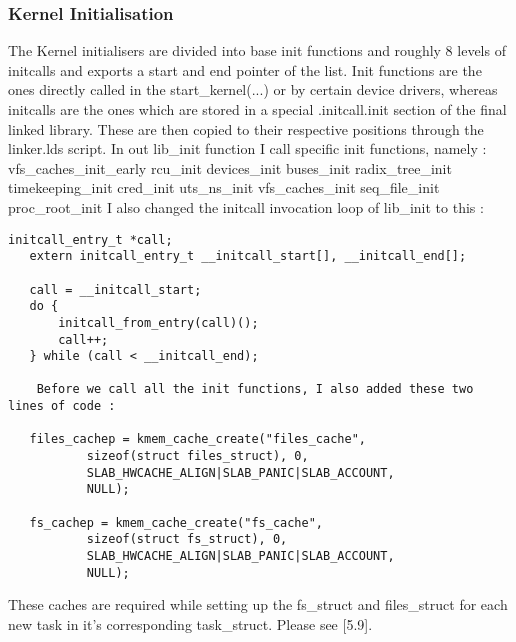 \documentclass{sig-alternate}
\begin{document}
\subsubsection{Kernel Initialisation}
The Kernel initialisers are divided into base init functions and roughly 8 levels of initcalls and exports a start and end pointer of the list. 
Init functions are the ones directly called in the start\_kernel(...) or by certain device drivers, whereas initcalls are the ones which are stored 
in a special .initcall.init section of the final linked library. These are then copied to their respective positions through the linker.lds script.
In out lib\_init function I call specific init functions, namely : 
vfs\_caches\_init\_early
rcu\_init
devices\_init 
buses\_init
radix\_tree\_init
timekeeping\_init
cred\_init
uts\_ns\_init 
vfs\_caches\_init 
seq\_file\_init 
proc\_root\_init
I also changed the initcall invocation loop of lib\_init to this : 
\begin{lstlisting}[style=CStyle] 
   initcall_entry_t *call;
   extern initcall_entry_t __initcall_start[], __initcall_end[];
 
   call = __initcall_start;
   do {               
       initcall_from_entry(call)();               
       call++;    
   } while (call < __initcall_end);

	Before we call all the init functions, I also added these two lines of code : 

   files_cachep = kmem_cache_create("files_cache",
           sizeof(struct files_struct), 0,
           SLAB_HWCACHE_ALIGN|SLAB_PANIC|SLAB_ACCOUNT,
           NULL);
 
   fs_cachep = kmem_cache_create("fs_cache",
           sizeof(struct fs_struct), 0,
           SLAB_HWCACHE_ALIGN|SLAB_PANIC|SLAB_ACCOUNT,
           NULL);
\end{lstlisting}
	These caches are required while setting up the fs\_struct and files\_struct for each new task in it’s corresponding task\_struct. Please see [5.9].
\end{document}
